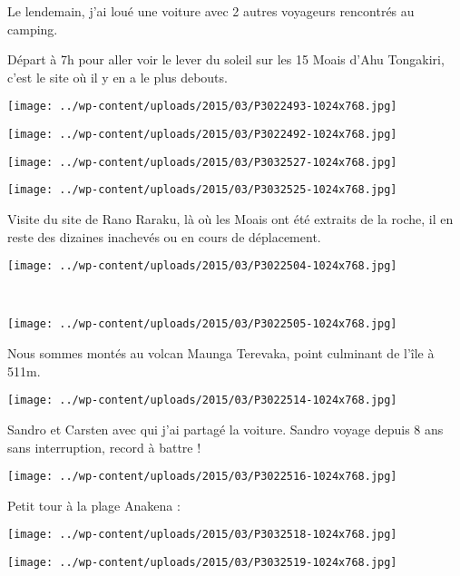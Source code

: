  Le lendemain, j'ai loué une voiture avec 2 autres voyageurs rencontrés au camping.

 Départ à 7h pour aller voir le lever du soleil sur les 15 Moais d'Ahu Tongakiri, c'est le site où il y en a le plus debouts.
\begin{center} \texttt{[image: ../wp-content/uploads/2015/03/P3022493-1024x768.jpg]} \end{center}
\begin{center} \texttt{[image: ../wp-content/uploads/2015/03/P3022492-1024x768.jpg]} \end{center}
\begin{center} \texttt{[image: ../wp-content/uploads/2015/03/P3032527-1024x768.jpg]} \end{center}
\begin{center} \texttt{[image: ../wp-content/uploads/2015/03/P3032525-1024x768.jpg]} \end{center}

Visite du site de Rano Raraku, là où les Moais ont été extraits de la roche, il en reste des dizaines inachevés ou en cours de déplacement.
\begin{center} \texttt{[image: ../wp-content/uploads/2015/03/P3022504-1024x768.jpg]} \end{center}
\vspace{-\topsep}
\pagebreak
~\\
\begin{center} \texttt{[image: ../wp-content/uploads/2015/03/P3022505-1024x768.jpg]} \end{center}

 Nous sommes montés au volcan Maunga Terevaka, point culminant de l'île à 511m.
\begin{center} \texttt{[image: ../wp-content/uploads/2015/03/P3022514-1024x768.jpg]} \end{center}
\vspace{-\topsep}

\pagebreak
 Sandro et Carsten avec qui j'ai partagé la voiture. Sandro voyage depuis 8 ans sans interruption, record à battre !
\begin{center} \texttt{[image: ../wp-content/uploads/2015/03/P3022516-1024x768.jpg]} \end{center}

Petit tour à la plage Anakena :\\
\begin{center} \texttt{[image: ../wp-content/uploads/2015/03/P3032518-1024x768.jpg]} \end{center}
\begin{center} \texttt{[image: ../wp-content/uploads/2015/03/P3032519-1024x768.jpg]} \end{center}

